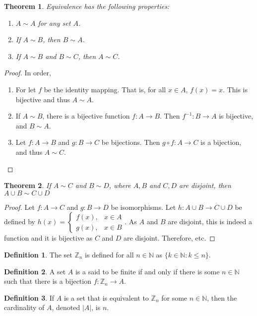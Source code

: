\documentclass[oneside]{book}
\newtheorem{theorem}{Theorem}[section]
\theoremstyle{definition}
\newtheorem{definition}{Definition}[section]
\begin{document}
\begin{theorem}
Equivalence has the following properties:
\begin{enumerate}
\item $A\sim A$ for any set $A$.
\item If $A\sim B$, then $B\sim A$.
\item If $A\sim B$ and $B\sim C$, then $A\sim C$.
\end{enumerate}
\end{theorem}
\begin{proof}
In order,
\begin{enumerate}
\item For let $f$ be the identity mapping. That is, for all $x\in A$, $f(x) = x$. This is bijective and thus $A\sim A$.
\item If $A\sim B$, there is a bijective function $f:A\rightarrow B$. Then $f^{-1}:B\rightarrow A$ is bijective, and $B\sim A$.
\item Let $f:A\rightarrow B$ and $g:B\rightarrow C$ be bijections. Then $g\circ f:A\rightarrow C$ is a bijection, and thus $A\sim C$.
\end{enumerate}
\end{proof}

\begin{theorem}
If $A\sim C$ and $B\sim D$, where $A,B$ and $C,D$ are disjoint, then $A\cup B \sim C\cup D$
\end{theorem}
\begin{proof}
Let $f:A\rightarrow C$ and $g:B\rightarrow D$ be isomorphisms. Let $h:A\cup B \rightarrow C\cup D$ be defined by $h(x) = \begin{cases} f(x), & x\in A\\ g(x), & x\in B\end{cases}$. As $A$ and $B$ are disjoint, this is indeed a function and it is bijective as $C$ and $D$ are disjoint. Therefore, etc.
\end{proof}

\begin{definition}
The set $\mathbb{Z}_n$ is defined for all $n\in \mathbb{N}$ as $\{k\in \mathbb{N}: k\leq n\}$.
\end{definition}

\begin{definition}
A set $A$ is a said to be finite if and only if there is some $n\in \mathbb{N}$ such that there is a bijection $f:\mathbb{Z}_n \rightarrow A$.
\end{definition}

\begin{definition}
If $A$ is a set that is equivalent to $\mathbb{Z}_n$ for some $n\in \mathbb{N}$, then the cardinality of $A$, denoted $|A|$, is $n$.
\end{definition}
\end{document}
